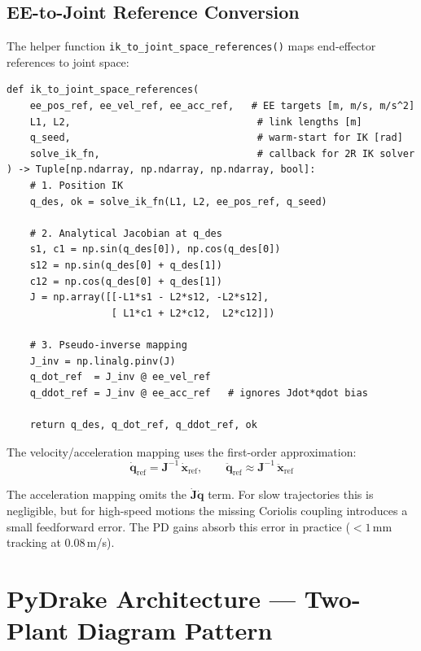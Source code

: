 \documentclass[11pt,a4paper]{article}
\newcommand{\bdq}{\dot{\bm{q}}}
\newcommand{\bddq}{\ddot{\bm{q}}}
\newcommand{\bJ}{\bm{J}}
\begin{document}
\subsection{EE-to-Joint Reference Conversion}

The helper function \texttt{ik\_to\_joint\_space\_references()} maps end-effector references to joint space:

\begin{lstlisting}[caption={EE-to-joint conversion --- \texttt{rl/computed\_torque\_controller.py}}]
def ik_to_joint_space_references(
    ee_pos_ref, ee_vel_ref, ee_acc_ref,   # EE targets [m, m/s, m/s^2]
    L1, L2,                                # link lengths [m]
    q_seed,                                # warm-start for IK [rad]
    solve_ik_fn,                           # callback for 2R IK solver
) -> Tuple[np.ndarray, np.ndarray, np.ndarray, bool]:
    # 1. Position IK
    q_des, ok = solve_ik_fn(L1, L2, ee_pos_ref, q_seed)

    # 2. Analytical Jacobian at q_des
    s1, c1 = np.sin(q_des[0]), np.cos(q_des[0])
    s12 = np.sin(q_des[0] + q_des[1])
    c12 = np.cos(q_des[0] + q_des[1])
    J = np.array([[-L1*s1 - L2*s12, -L2*s12],
                  [ L1*c1 + L2*c12,  L2*c12]])

    # 3. Pseudo-inverse mapping
    J_inv = np.linalg.pinv(J)
    q_dot_ref  = J_inv @ ee_vel_ref
    q_ddot_ref = J_inv @ ee_acc_ref   # ignores Jdot*qdot bias

    return q_des, q_dot_ref, q_ddot_ref, ok
\end{lstlisting}

\begin{codemath}
The velocity/acceleration mapping uses the first-order approximation:
\[
    \bdq_{\mathrm{ref}} = \bJ^{-1}\,\dot{\bm{x}}_{\mathrm{ref}}, \qquad
    \bddq_{\mathrm{ref}} \approx \bJ^{-1}\,\ddot{\bm{x}}_{\mathrm{ref}}
\]

\begin{warnbox}
The acceleration mapping omits the $\dot{\bJ}\bdq$ term.  For slow trajectories this is negligible, but for high-speed motions the missing Coriolis coupling introduces a small feedforward error.  The PD gains absorb this error in practice ($<1$\,mm tracking at 0.08\,m/s).
\end{warnbox}
\end{codemath}


\section{PyDrake Architecture --- Two-Plant Diagram Pattern}
\label{sec:architecture}
\end{document}
